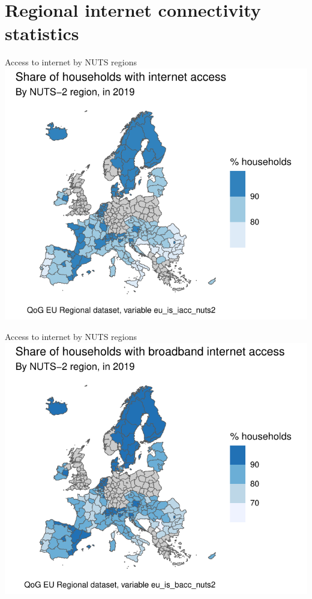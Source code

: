 \documentclass[10pt]{beamer}
\begin{document}
\section{Regional internet connectivity statistics}

\begin{frame}{Access to internet by NUTS regions}
\centering
\includegraphics[width=\textwidth,height=0.9\textheight,keepaspectratio]{nuts_internet_2019.pdf}
\end{frame}

\begin{frame}{Access to internet by NUTS regions}
\centering
\includegraphics[width=\textwidth,height=0.9\textheight,keepaspectratio]{nuts_broadband_2019.pdf}
\end{frame}
\end{document}

